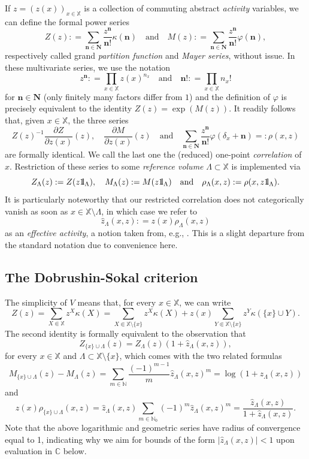 \documentclass[10pt,a4paper]{amsart}
\newcommand{\N}{\mathbb{N}}
\newcommand{\C}{\mathbb{C}}
\newcommand{\X}{\mathbb X}
\def\1{{\mathchoice {1\mskip-4mu\mathrm l}      
{1\mskip-4mu\mathrm l}
{1\mskip-4.5mu\mathrm l} {1\mskip-5mu\mathrm l}}}
\begin{document}
If $z = (z(x))_{x \in \X}$ is a collection of commuting abstract \emph{activity} variables, we can define the formal power series
\[
	Z(z) : = \sum_{\mathbf n \in \mathbf N} \frac{z^\mathbf n}{\mathbf n!} \kappa(\mathbf n) \quad \text{and} \quad M(z) : = \sum_{\mathbf n \in \mathbf N} \frac{z^\mathbf n}{\mathbf n!} \varphi(\mathbf n),
\]
respectively called grand \emph{partition function} and \emph{Mayer series}, without issue. 
In these multivariate series, we use the notation
\[
	z^\mathbf n : = \prod_{x \in \X} z(x)^{n_x} \quad \text{and} \quad \mathbf n! : = \prod_{x \in \X} n_x!
\]
for $\mathbf n \in \mathbf N$ (only finitely many factors differ from $1$) and the definition of $\varphi$ is precisely equivalent to the identity $Z(z) = \exp(M(z))$. 
It readily follows that, given $x \in \X$, the three series
\[
	Z(z)^{-1} \frac{\partial Z}{\partial z(x)} (z), \quad \frac{\partial M}{\partial z(x)} (z) \quad \text{and} \quad \sum_{\mathbf n \in \mathbf N} \frac{z^\mathbf n}{\mathbf n!} \varphi(\delta_x + \mathbf n) = : \rho(x, z)
\]
are formally identical. 
We call the last one the (reduced) one-point \emph{correlation} of $x$. 
Restriction of these series to some \emph{reference volume} $\Lambda \subset \X$ is implemented via
\[
	Z_\Lambda(z) : = Z(z \1_\Lambda), \quad M_\Lambda(z) : = M(z \1_\Lambda) \quad \text{and} \quad \rho_\Lambda(x, z) : = \rho(x, z \1_\Lambda).
\]
It is particularly noteworthy that our restricted correlation does not categorically vanish as soon as $x \in \X \setminus \Lambda$, in which case we refer to
\[
	\widehat z_\Lambda(x, z) :  = z(x) \rho_\Lambda(x, z)
\]
as an \emph{effective activity}, a notion taken from, e.g., \cite{ref:scott-sokal, ref:jansen-tsagkarogiannis, ref:jansen-hierarchical, ref:jansen-neumann}. 
This is a slight departure from the standard notation due to convenience here.

\subsection{The Dobrushin-Sokal criterion}

The simplicity of $V$ means that, for every $x \in \X$, we can write
\[
	Z(z) = \sum_{X \Subset \X} z^X \kappa(X) = \sum_{X \Subset \X \setminus \{x\}} z^X \kappa(X) + z(x) \sum_{Y \Subset \X \setminus \{x\}} z^Y \kappa(\{x\} \cup Y).
\]
The second identity is formally equivalent to the observation that
\[
	Z_{\{x\} \cup \Lambda}(z) = Z_\Lambda(z) (1 + \widehat z_\Lambda(x, z)),
\]
for every $x \in \X$ and $\Lambda \subset \X \setminus \{x\}$, which comes with the two related formulas
\[
	M_{\{x\} \cup \Lambda}(z) - M_\Lambda(z) = \sum_{m \in \N} \frac{(-1)^{m-1}}{m}\widehat z_\Lambda(x, z)^m = \log(1 + \widehat z_\Lambda(x, z))
\]
and
\[
	z(x) \rho_{\{x\} \cup \Lambda}(x, z) = \widehat z_\Lambda(x, z) \sum_{m \in \N_0} (-1)^m \widehat z_\Lambda(x, z)^m = \frac{\widehat z_\Lambda(x, z)}{1 + \widehat z_\Lambda(x, z)}.
\]
Note that the above logarithmic and geometric series have radius of convergence equal to 1, indicating why we aim for bounds of the form $|\widehat z_\Lambda(x, z)| < 1$ upon evaluation in $\C$ below.
\end{document}
